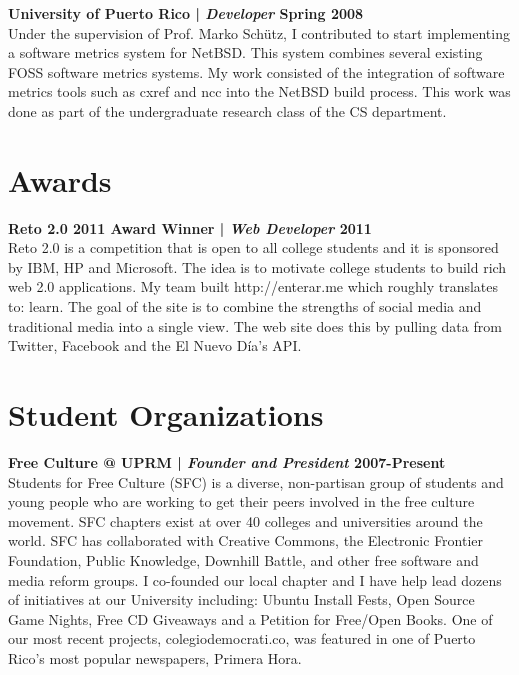\documentclass[margin,line]{res}
\begin{document}
\begin{resume}
{\bf University of Puerto Rico | {\em Developer} \hfill {\bf Spring 2008 \\} }
\vspace{-.01cm}
Under the supervision of Prof. Marko Schütz, I contributed to start implementing a software metrics system for NetBSD. This system combines several existing FOSS software metrics systems. My work consisted of the integration of software metrics tools such as cxref and ncc into the NetBSD build process. This work was done as part of the undergraduate research class of the CS department.

\section{\sc Awards}

{\bf Reto 2.0 2011 Award Winner | {\em Web Developer} \hfill {\bf 2011 \\} }
\vspace{-.01cm}
Reto 2.0 is a competition that is open to all college students and it is sponsored by IBM, HP and Microsoft. The idea is to motivate college students to build rich web 2.0 applications. My team built http://enterar.me which roughly translates to: learn. The goal of the site is to combine the strengths of social media and traditional media into a single view. The web site does this by pulling data from Twitter, Facebook and the El Nuevo Día's API.

\section{\sc Student Organizations}

{\bf Free Culture @ UPRM | {\em Founder and President} \hfill {\bf 2007-Present \\} }
\vspace{-.01cm}
Students for Free Culture (SFC) is a diverse, non-partisan group of students and young people who are working to get their peers involved in the free culture movement. SFC chapters exist at over 40 colleges and universities around the world. SFC has collaborated with Creative Commons, the Electronic Frontier Foundation, Public Knowledge, Downhill Battle, and other free software and media reform groups. I co-founded our local chapter and I have help lead dozens of initiatives at our University including: Ubuntu Install Fests, Open Source Game Nights, Free CD Giveaways and a Petition for Free/Open Books. One of our most recent projects, colegiodemocrati.co, was featured in one of Puerto Rico's most popular newspapers, Primera Hora.


\end{resume}
\end{document}
